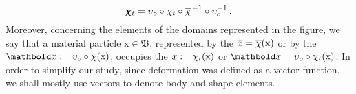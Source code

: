 \begin{equation}
\pmb{\chi}_t = \upsilon_o\circ\chi_t\circ\overline{\chi}^{\,-1}\circ\upsilon_o^{-1}\,.
\end{equation}
Moreover, concerning the elements of the domains represented in the figure, we say that a material particle $\text{x}\in\mathfrak{B}$, represented by the  $\overline{x}=\overline{\chi}(\text{x})$ or by the  $\vto{\overline{x}}:=\fua{\upsilon_o\circ\overline{\chi}}{\text{x}}$, occupies the  $x:=\chi_t(\text{x})$ or $\vto{x}=\fua{\upsilon_o\circ\chi_t}{\text{x}}$. In order to simplify our study, since deformation was defined as a vector function, we shall mostly use vectors to denote body and shape elements.  

